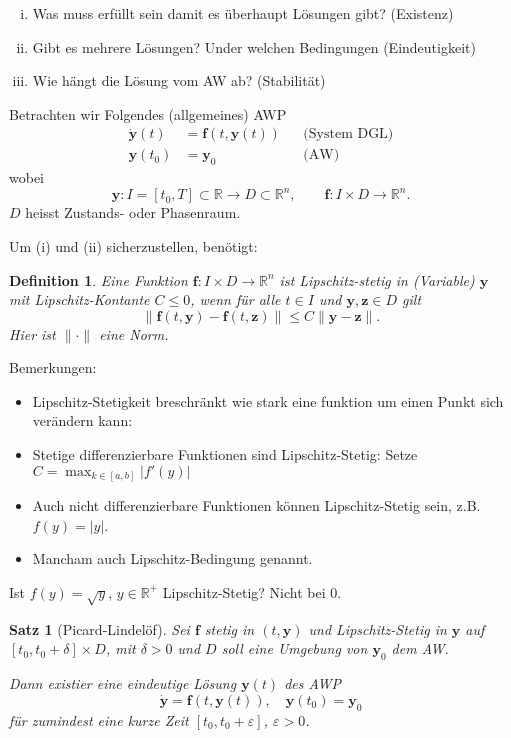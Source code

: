 \documentclass[a4paper]{article}
\newtheorem{defn}{Definition}
\newtheorem{thm}{Satz}
\renewcommand{\vec}[1]{\mathbf{\bm{#1}}}
\begin{document}
\begin{enumerate}[(i)]
  \item Was muss erfüllt sein damit es überhaupt Lösungen gibt? (Existenz)
  \item Gibt es mehrere Lösungen? Under welchen Bedingungen (Eindeutigkeit)
  \item Wie hängt die Lösung vom AW ab? (Stabilität)
\end{enumerate}

Betrachten wir Folgendes (allgemeines) AWP
\begin{align*}
  \dot{\vec{y}}(t) &= \vec{f}(t, \vec{y}(t)) & &\text{(System DGL)} \\
  \vec{y}(t_0) &= \vec{y}_0  & &\text{(AW)}
\end{align*}
wobei
\[
  \vec{y} : I = [t_0, T] \subset \mathbb{R} \to D \subset \mathbb{R}^n,
  \qquad
  \vec{f}: I \times D \to \mathbb{R}^n.
\]
$D$ heisst Zustands- oder Phasenraum.

Um (i) und (ii) sicherzustellen, benötigt:

\begin{defn}
  Eine Funktion $\vec{f}: I \times D \to \mathbb{R}^n$ ist Lipschitz-stetig in
  (Variable) $\vec{y}$ mit Lipschitz-Kontante $C \leq 0$, wenn für alle $t \in
  I$ und $\vec{y}, \vec{z} \in D$ gilt
  \[
    \|\vec{f}(t, \vec{y}) - \vec{f}(t, \vec{z})\|
    \leq C \|\vec{y} - \vec{z}\|.
  \]
  Hier ist $\| \cdot \|$ eine Norm.
\end{defn}

Bemerkungen:
\begin{itemize}
  \item Lipschitz-Stetigkeit breschränkt wie stark eine funktion um einen
    Punkt sich verändern kann:
    \begin{center}
      \skelfig
    \end{center}
  \item Stetige differenzierbare Funktionen sind Lipschitz-Stetig: Setze $C =
    \max_{k \in [a,b]} | f'(y) |$
  \item Auch nicht differenzierbare Funktionen können Lipschitz-Stetig sein,
    z.B. $f(y) = |y|$.
  \item Mancham auch Lipschitz-Bedingung genannt.
\end{itemize}

Ist $f(y) = \sqrt{y}$, $y \in \mathbb{R}^+$ Lipschitz-Stetig? Nicht bei 0.

\begin{thm}[Picard-Lindelöf]
  Sei $\vec{f}$ stetig in $(t, \vec{y})$ und Lipschitz-Stetig in $\vec{y}$ auf
  $[t_0, t_0 + \delta] \times D$, mit $\delta > 0$ und $D$ soll eine Umgebung
  von $\vec{y}_0$ dem AW.

  Dann existier eine eindeutige Lösung $\vec{y}(t)$ des AWP
  \[
    \dot{\vec{y}} = \vec{f}(t, \vec{y}(t)), \quad
    \vec{y}(t_0) = \vec{y}_0
  \]
  für zumindest eine kurze Zeit $[t_0, t_0 + \varepsilon]$, $\varepsilon > 0$.
\end{thm}
\end{document}
